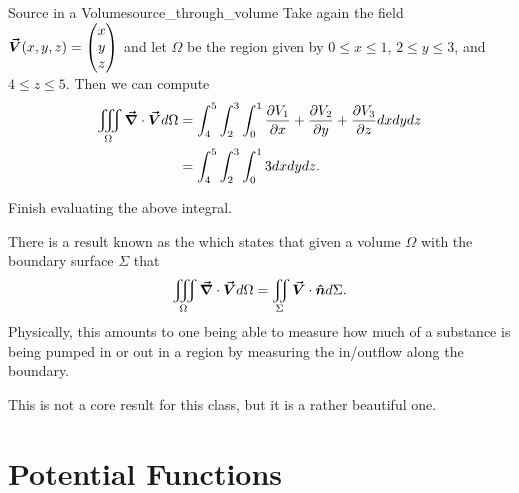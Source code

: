         \begin{ex}{Source in a Volume}{source_through_volume}
         	Take again the field $\boldsymbol{\vec{V}}(x,y,z) = \begin{pmatrix} x \\ y \\ z \end{pmatrix}$ and let $\Omega$ be the region given by $0\leq x \leq 1$, $2\leq y \leq 3$, and $4\leq z \leq 5$.  Then we can compute
         	\begin{align*}
         		\iiint_\Omega \boldsymbol{\vec{\nabla}} \cdot \boldsymbol{\vec{V}} d\Omega &= \int_4^5 \int_2^3 \int_0^1 \frac{\partial V_1}{\partial x}+\frac{\partial V_2}{\partial y} + \frac{\partial V_3}{\partial z} dxdydz\\
         		&= \int_4^5 \int_2^3 \int_0^1 3 dxdydz.
         	\end{align*}
         \end{ex}
         
         \begin{exercise}
         	Finish evaluating the above integral.
         \end{exercise}
         
         \begin{remark}
         	There is a result known as the  which states that given a volume $\Omega$ with the boundary surface $\Sigma$ that
         	\[
         	\iiint_\Omega \boldsymbol{\vec{\nabla}} \cdot \boldsymbol{\vec{V}} d\Omega = \iint_\Sigma \boldsymbol{\vec{V}} \cdot \boldsymbol{\hat{n}} d\Sigma.
         	\]
         	Physically, this amounts to one being able to measure how much of a substance is being pumped in or out in a region by measuring the in/outflow along the boundary. 
         	
         	This is not a core result for this class, but it is a rather beautiful one.
         \end{remark}
        
       
        
        
      \section{Potential Functions}
      
